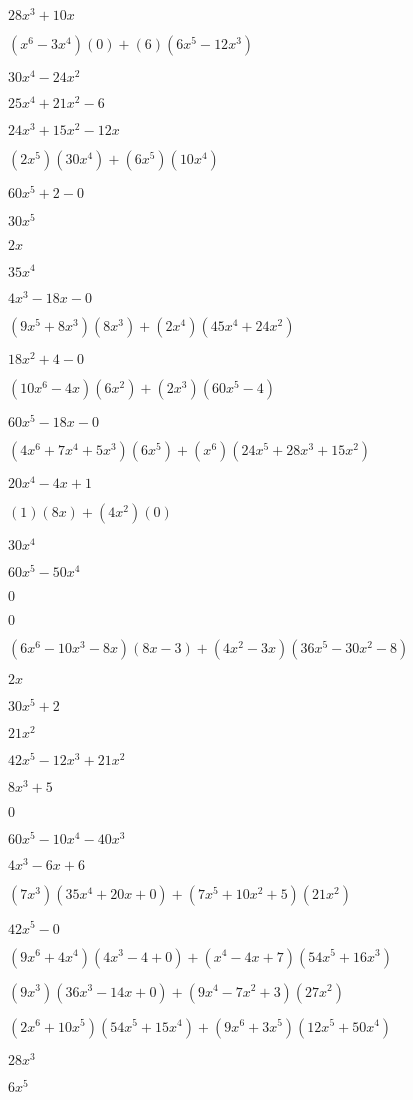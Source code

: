 \documentclass{article}
\begin{document}
\begin{multicols}{2}
$28x^{3}+10x$\item $(x^{6}-3x^{4})(0)+(6)(6x^{5}-12x^{3})$\item $30x^{4}-24x^{2}$\item $25x^{4}+21x^{2}-6$\item $24x^{3}+15x^{2}-12x$\item $(2x^{5})(30x^{4})+(6x^{5})(10x^{4})$\item $60x^{5}+2-0$\item $30x^{5}$\item $2x$\item $35x^{4}$\item $4x^{3}-18x-0$\item $(9x^{5}+8x^{3})(8x^{3})+(2x^{4})(45x^{4}+24x^{2})$\item $18x^{2}+4-0$\item $(10x^{6}-4x)(6x^{2})+(2x^{3})(60x^{5}-4)$\item $60x^{5}-18x-0$\item $(4x^{6}+7x^{4}+5x^{3})(6x^{5})+(x^{6})(24x^{5}+28x^{3}+15x^{2})$\item $20x^{4}-4x+1$\item $(1)(8x)+(4x^2)(0)$\item $30x^{4}$\item $60x^{5}-50x^{4}$\item $0$\item $0$\item $(6x^{6}-10x^{3}-8x)(8x-3)+(4x^2-3x)(36x^{5}-30x^{2}-8)$\item $2x$\item $30x^{5}+2$\item $21x^{2}$\item $42x^{5}-12x^{3}+21x^{2}$\item $8x^{3}+5$\item $0$\item $60x^{5}-10x^{4}-40x^{3}$\item $4x^{3}-6x+6$\item $(7x^{3})(35x^{4}+20x+0)+(7x^{5}+10x^2+5)(21x^{2})$\item $42x^{5}-0$\item $(9x^{6}+4x^{4})(4x^{3}-4+0)+(x^{4}-4x+7)(54x^{5}+16x^{3})$\item $(9x^{3})(36x^{3}-14x+0)+(9x^{4}-7x^2+3)(27x^{2})$\item $(2x^{6}+10x^{5})(54x^{5}+15x^{4})+(9x^{6}+3x^{5})(12x^{5}+50x^{4})$\item $28x^{3}$\item $6x^{5}$\item 
\end{multicols}
\end{document}
